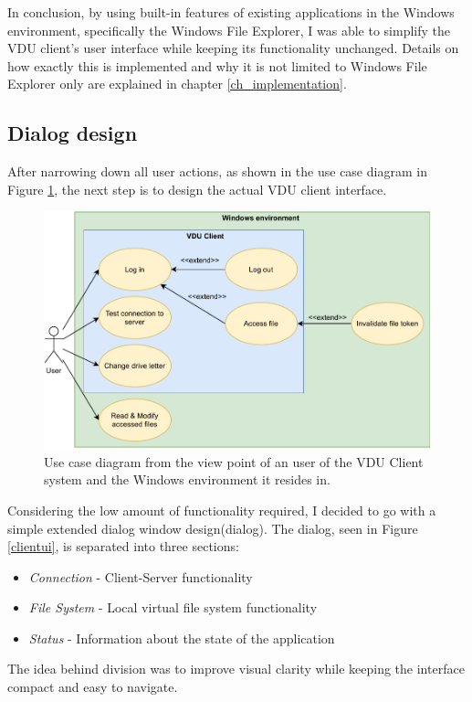 In conclusion, by using built-in features of existing applications in the Windows environment, specifically the Windows File Explorer, I was able to simplify the VDU client's user interface while keeping its functionality unchanged. Details on how exactly this is implemented and why it is not limited to Windows File Explorer only are explained in chapter \ref{ch_implementation}.

\subsection{Dialog design}
\label{dialogdesign}
After narrowing down all user actions, as shown in the use case diagram in Figure \ref{usecasediagr}, the next step is to design the actual VDU client interface.

\begin{figure}[htb]
    \centering
    \includegraphics[width=\columnwidth]{obrazky-figures/usecasediagr.pdf}
	\caption{Use case diagram from the view point of an user of the VDU Client system and the Windows environment it resides in.}
	\label{usecasediagr}
\end{figure}

 Considering the low amount of functionality required, I decided to go with a simple extended dialog window design(dialog). The dialog, seen in Figure \ref{clientui}, is separated into three sections:
 \begin{itemize}
     \item \textit{Connection} - Client-Server functionality
     \item \textit{File System} - Local virtual file system functionality
     \item \textit{Status} - Information about the state of the application
 \end{itemize}
The idea behind division was to improve visual clarity while keeping the interface compact and easy to navigate.


